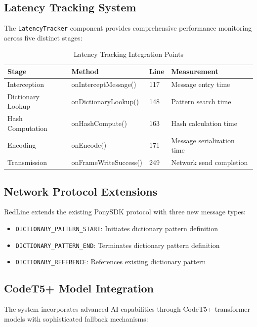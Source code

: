 \documentclass[12pt,a4paper]{article}
\begin{document}
\subsection{Latency Tracking System}

The \texttt{LatencyTracker} component provides comprehensive performance monitoring across five distinct stages:

\begin{table}[H]
\centering
\begin{tabular}{|l|l|l|l|}
\hline
\textbf{Stage} & \textbf{Method} & \textbf{Line} & \textbf{Measurement} \\
\hline
Interception & onInterceptMessage() & 117 & Message entry time \\
Dictionary Lookup & onDictionaryLookup() & 148 & Pattern search time \\
Hash Computation & onHashCompute() & 163 & Hash calculation time \\
Encoding & onEncode() & 171 & Message serialization time \\
Transmission & onFrameWriteSuccess() & 249 & Network send completion \\
\hline
\end{tabular}
\caption{Latency Tracking Integration Points}
\label{tab:latency-tracking}
\end{table}

\subsection{Network Protocol Extensions}

RedLine extends the existing PonySDK protocol with three new message types:

\begin{itemize}
    \item \texttt{DICTIONARY\_PATTERN\_START}: Initiates dictionary pattern definition
    \item \texttt{DICTIONARY\_PATTERN\_END}: Terminates dictionary pattern definition
    \item \texttt{DICTIONARY\_REFERENCE}: References existing dictionary pattern
\end{itemize}

\subsection{CodeT5+ Model Integration}

The system incorporates advanced AI capabilities through CodeT5+ transformer models with sophisticated fallback mechanisms:
\end{document}
